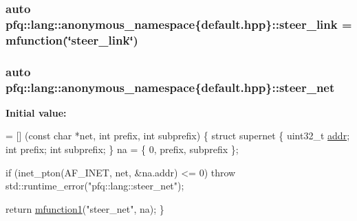 \hypertarget{namespacepfq_1_1lang_1_1anonymous__namespace_02default_8hpp_03_ac1f3f9a2caf886a1441e62860a4ca058}{
\subsubsection[{steer\+\_\+link}]{\setlength{\rightskip}{0pt plus 5cm}auto pfq\+::lang\+::anonymous\+\_\+namespace\{default.\+hpp\}\+::steer\+\_\+link = {\bf mfunction}(\char`\"{}steer\+\_\+link\char`\"{})}}\label{namespacepfq_1_1lang_1_1anonymous__namespace_02default_8hpp_03_ac1f3f9a2caf886a1441e62860a4ca058}
\hypertarget{namespacepfq_1_1lang_1_1anonymous__namespace_02default_8hpp_03_a6f8d514e40bb2b0e874fb26d2b416dc3}{
\subsubsection[{steer\+\_\+net}]{\setlength{\rightskip}{0pt plus 5cm}auto pfq\+::lang\+::anonymous\+\_\+namespace\{default.\+hpp\}\+::steer\+\_\+net}}\label{namespacepfq_1_1lang_1_1anonymous__namespace_02default_8hpp_03_a6f8d514e40bb2b0e874fb26d2b416dc3}
{\bfseries Initial value\+:}
\begin{DoxyCode}
= [] (\textcolor{keyword}{const} \textcolor{keywordtype}{char} *net, \textcolor{keywordtype}{int} prefix, \textcolor{keywordtype}{int} subprefix)
        \{
            \textcolor{keyword}{struct }supernet \{
                uint32\_t \hyperlink{namespacepfq_1_1lang_1_1anonymous__namespace_02default_8hpp_03_a13cabe468839119d8d68540e3c60718b}{addr};
                \textcolor{keywordtype}{int}      prefix;
                \textcolor{keywordtype}{int}      subprefix;
            \} na = \{ 0, prefix, subprefix \};

            \textcolor{keywordflow}{if} (inet\_pton(AF\_INET, net, &na.addr) <= 0)
                \textcolor{keywordflow}{throw} std::runtime\_error(\textcolor{stringliteral}{"pfq::lang::steer\_net"});

            \textcolor{keywordflow}{return} \hyperlink{namespacepfq_1_1lang_a68d775c68562fbd0ab9ef213f2519499}{mfunction1}(\textcolor{stringliteral}{"steer\_net"}, na);
        \}
\end{DoxyCode}
